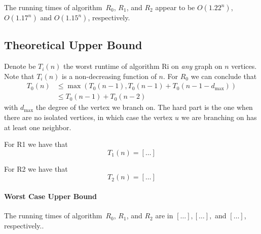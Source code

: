 \documentclass{tufte-handout}
\begin{document}
The running times of algorithm~$R_0$, $R_1$, and $R_2$ appear to be
$O(1.22^n)$, $O(1.17^n)$ and $O(1.15^n)$, respectively.

\subsection{Theoretical Upper Bound}

Denote be $T_i(n)$ the worst runtime of algorithm Ri on \emph{any} graph on $n$ vertices.
Note that $T_i(n)$ is a non-decreasing function of $n$.
For $R_0$ we can conclude that
\begin{align*}
T_0(n) &\leq\max(T_0(n-1), T_0(n-1)+T_0(n-1-d_{\mbox{max}})) \\ &\leq T_0(n-1)+T_0(n-2)
\end{align*}
with $d_{\mbox{max}}$ the degree of the vertex we branch on. The hard part is the one when there are no isolated vertices, in which case the vertex $u$ we are branching on has at least one neighbor. 

For R1 we have that
 \[
 T_1(n)=[\ldots]
 \]

For R2 we have that
 \[
 T_2(n)=[\ldots]
 \]
\paragraph{Worst Case Upper Bound}
The running times of algorithm~$R_0$, $R_1$, and $R_2$ are in
$[\ldots],[\ldots],$ and $[\ldots]$, respectively.. \newpage
\end{document}
